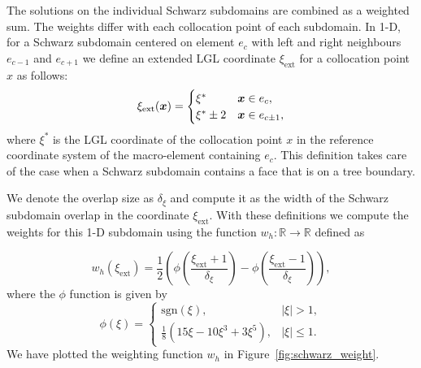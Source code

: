 The solutions on the individual Schwarz subdomains are
  combined as a weighted sum.  The weights differ with each
  collocation point of each subdomain. In 1-D, for a Schwarz
  subdomain centered on element $e_c$ with left and right neighbours
  $e_{c-1}$ and $e_{c+1}$ we define an extended LGL coordinate $\xi_{\text{ext}}$
  for a collocation point $x$ as follows:
%
  \begin{equation}
\xi_{\text{ext}}(\boldsymbol{x}) = \begin{cases} 
      \xi^* & \boldsymbol{x} \in e_c, \\
      \xi^* \pm 2 & \boldsymbol{x} \in e_{c\pm1},
\end{cases}
  \end{equation}
where $\xi^*$ is the LGL coordinate of the collocation point $x$ in the reference coordinate system of the macro-element containing $e_c$. This definition takes care of the case when a Schwarz subdomain contains a face that is on a tree boundary.
  
  We denote the overlap size as $\delta_\xi$ and compute it as the width
  of the Schwarz subdomain overlap in the coordinate $\xi_{\text{ext}}$. With
  these definitions we compute the weights for this 1-D subdomain using
  the function $w_h:\mathbb{R}\to\mathbb{R}$ defined as
  
  

\begin{equation}
  \label{eqn:schwarz_weight}
  w_h(\xi_{\text{ext}}) = \frac{1}{2}\left(\phi\left(\frac{\xi_{\text{ext}}+1}{\delta_\xi}\right) - \phi\left(\frac{\xi_{\text{ext}}-1}{\delta_\xi}\right)\right),
\end{equation}
%
where the $\phi$ function is given by
%
\begin{equation}
\phi(\xi) = \begin{cases} 
      \text{sgn}(\xi), & |\xi| > 1, \\
      \frac{1}{8}(15\xi - 10\xi^3 + 3\xi^5), & |\xi| \leq 1.
   \end{cases}
\end{equation}
We have plotted the weighting function $w_h$ in
Figure~\ref{fig:schwarz_weight}.

